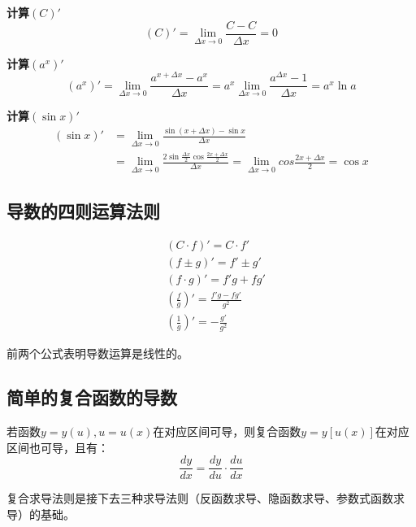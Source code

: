 {\bf 计算$\left( C \right) '$}
\[
\left( C \right) '=\underset{\Delta x\rightarrow 0}{\lim}\frac{C-C}{\Delta x}=0
\]

{\bf 计算$\left( a^x \right) '$}
\[
\left( a^x \right) '=\underset{\Delta x\rightarrow 0}{\lim}\frac{a^{x+\Delta x}-a^x}{\Delta x}=a^x\underset{\Delta x\rightarrow 0}{\lim}\frac{a^{\Delta x}-1}{\Delta x}=a^x\ln a
\]

{\bf 计算$\left( \sin x \right) '$}
\begin{align*}
\left( \sin x \right) '&=\underset{\Delta x\rightarrow 0}{\lim}\frac{\sin \left( x+\Delta x \right) -\sin x}{\Delta x} \\
&=\underset{\Delta x\rightarrow 0}{\lim}\frac{2\sin \frac{\Delta x}{2}\cos \frac{2x+\Delta x}{2}}{\Delta x}=\underset{\Delta x\rightarrow 0}{\lim}cos \frac{2x+\Delta x}{2}=\cos x
\end{align*}

\subsection{导数的四则运算法则}

\begin{align*}
&\left( C\cdot f \right) '=C\cdot f' \\
&\left( f\pm g \right) '=f'\pm g' \\
&\left( f\cdot g \right) '=f'g+fg' \\
&\left( \frac{f}{g} \right) '=\frac{f'g-fg'}{g^2} \\
&\left( \frac{1}{g} \right) '=-\frac{g'}{g^2}
\end{align*}

前两个公式表明导数运算是线性的。

\subsection{简单的复合函数的导数}

\begin{theorem}[复合函数求导定理]
若函数$y=y\left( u \right) ,u=u\left( x \right) $在对应区间可导，则复合函数$y=y\left[ u\left( x \right) \right] $在对应区间也可导，且有：
\[
\frac{dy}{dx}=\frac{dy}{du}\cdot \frac{du}{dx}
\]
\end{theorem}

复合求导法则是接下去三种求导法则（反函数求导、隐函数求导、参数式函数求导）的基础。

